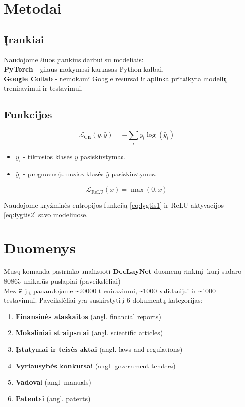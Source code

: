 \documentclass[conference]{IEEEtran}
\begin{document}
\section{Metodai}

\subsection{Įrankiai}
Naudojome šiuos įrankius darbui su modeliais: \\
\textbf{PyTorch} - gilaus mokymosi karkasas Python kalbai. \\
\textbf{Google Collab} - nemokami Google resursai ir aplinka pritaikyta modelių treniravimui ir testavimui.


\subsection{Funkcijos}

\begin{equation}
    \mathcal{L}_{\text{CE}}(y, \hat{y}) = - \sum_{i} y_i \log(\hat{y}_i)
    \label{eq:lygtis1}
\end{equation}

\begin{itemize}
    \item $y_i$ - tikrosios klasės $y$ pasiskirstymas.
    \item $\hat{y}_i$ - prognozuojamosios klasės $\hat{y}$ pasiskirstymas.
\end{itemize}

\begin{equation}
    \mathcal{L}_{\text{ReLU}}(x) = \max(0, x)
    \label{eq:lygtis2}
\end{equation}
    
Naudojome kryžminės entropijos funkciją \eqref{eq:lygtis1} ir ReLU aktyvacijos \eqref{eq:lygtis2} savo modeliuose.

\section{Duomenys}
Mūsų komanda pasirinko analizuoti \textbf{DocLayNet} duomenų rinkinį, kurį sudaro 80863 unikalūs puslapiai (paveikslėliai) \cite{doclaynet2022} \\ Mes iš jų panaudojome \textasciitilde20000 treniravimui, \textasciitilde1000 validacijai ir \textasciitilde1000 testavimui. Paveikslėliai yra suskirstyti į 6 dokumentų kategorijas:

\begin{enumerate}
    \item \textbf{Finansinės ataskaitos} (angl. financial reports)
    \item \textbf{Moksliniai straipsniai} (angl. scientific articles)
    \item \textbf{Įstatymai ir teisės aktai} (angl. laws and regulations)
    \item \textbf{Vyriausybės konkursai} (angl. government tenders)
    \item \textbf{Vadovai} (angl. manuals)
    \item \textbf{Patentai} (angl. patents)
\end{enumerate}
\end{document}
